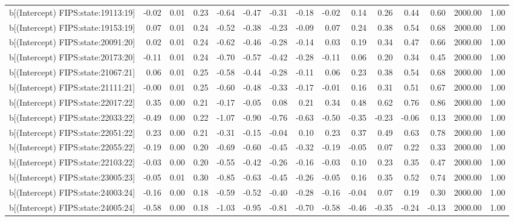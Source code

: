 \begin{table}[ht]
\begin{tabular}{rrrrrrrrrrrrrrr}
  b[(Intercept) FIPS:state:19113:19] & -0.02 & 0.01 & 0.23 & -0.64 & -0.47 & -0.31 & -0.18 & -0.02 & 0.14 & 0.26 & 0.44 & 0.60 & 2000.00 & 1.00 \\ 
  b[(Intercept) FIPS:state:19153:19] & 0.07 & 0.01 & 0.24 & -0.52 & -0.38 & -0.23 & -0.09 & 0.07 & 0.24 & 0.38 & 0.54 & 0.68 & 2000.00 & 1.00 \\ 
  b[(Intercept) FIPS:state:20091:20] & 0.02 & 0.01 & 0.24 & -0.62 & -0.46 & -0.28 & -0.14 & 0.03 & 0.19 & 0.34 & 0.47 & 0.66 & 2000.00 & 1.00 \\ 
  b[(Intercept) FIPS:state:20173:20] & -0.11 & 0.01 & 0.24 & -0.70 & -0.57 & -0.42 & -0.28 & -0.11 & 0.06 & 0.20 & 0.34 & 0.45 & 2000.00 & 1.00 \\ 
  b[(Intercept) FIPS:state:21067:21] & 0.06 & 0.01 & 0.25 & -0.58 & -0.44 & -0.28 & -0.11 & 0.06 & 0.23 & 0.38 & 0.54 & 0.68 & 2000.00 & 1.00 \\ 
  b[(Intercept) FIPS:state:21111:21] & -0.00 & 0.01 & 0.25 & -0.60 & -0.48 & -0.33 & -0.17 & -0.01 & 0.16 & 0.31 & 0.51 & 0.67 & 2000.00 & 1.00 \\ 
  b[(Intercept) FIPS:state:22017:22] & 0.35 & 0.00 & 0.21 & -0.17 & -0.05 & 0.08 & 0.21 & 0.34 & 0.48 & 0.62 & 0.76 & 0.86 & 2000.00 & 1.00 \\ 
  b[(Intercept) FIPS:state:22033:22] & -0.49 & 0.00 & 0.22 & -1.07 & -0.90 & -0.76 & -0.63 & -0.50 & -0.35 & -0.23 & -0.06 & 0.13 & 2000.00 & 1.00 \\ 
  b[(Intercept) FIPS:state:22051:22] & 0.23 & 0.00 & 0.21 & -0.31 & -0.15 & -0.04 & 0.10 & 0.23 & 0.37 & 0.49 & 0.63 & 0.78 & 2000.00 & 1.00 \\ 
  b[(Intercept) FIPS:state:22055:22] & -0.19 & 0.00 & 0.20 & -0.69 & -0.60 & -0.45 & -0.32 & -0.19 & -0.05 & 0.07 & 0.22 & 0.33 & 2000.00 & 1.00 \\ 
  b[(Intercept) FIPS:state:22103:22] & -0.03 & 0.00 & 0.20 & -0.55 & -0.42 & -0.26 & -0.16 & -0.03 & 0.10 & 0.23 & 0.35 & 0.47 & 2000.00 & 1.00 \\ 
  b[(Intercept) FIPS:state:23005:23] & -0.05 & 0.01 & 0.30 & -0.85 & -0.63 & -0.45 & -0.26 & -0.05 & 0.16 & 0.35 & 0.52 & 0.74 & 2000.00 & 1.00 \\ 
  b[(Intercept) FIPS:state:24003:24] & -0.16 & 0.00 & 0.18 & -0.59 & -0.52 & -0.40 & -0.28 & -0.16 & -0.04 & 0.07 & 0.19 & 0.30 & 2000.00 & 1.00 \\ 
  b[(Intercept) FIPS:state:24005:24] & -0.58 & 0.00 & 0.18 & -1.03 & -0.95 & -0.81 & -0.70 & -0.58 & -0.46 & -0.35 & -0.24 & -0.13 & 2000.00 & 1.00 \\ 

\end{tabular}
\end{table}

